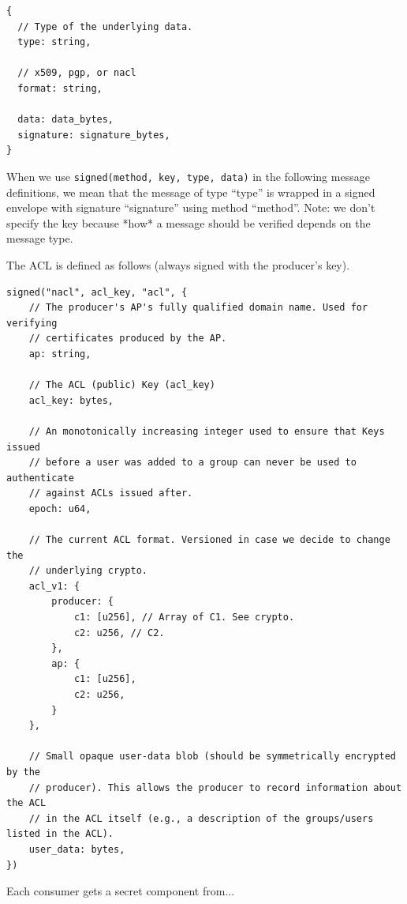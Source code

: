 \documentclass[pdftex,12pt,a4papaer,twoside,notitlepage]{report}
\begin{document}
\begin{lstlisting}[caption={Signed Envelope},float,floatplacement=H]
{
  // Type of the underlying data.
  type: string,

  // x509, pgp, or nacl
  format: string,

  data: data_bytes,
  signature: signature_bytes,
}
\end{lstlisting}

When we use \verb=signed(method, key, type, data)= in the following message
definitions, we mean that the message of type ``type'' is wrapped in a signed
envelope with signature ``signature'' using method ``method''. Note: we don't
specify the key because *how* a message should be verified depends on the
message type.

The ACL is defined as follows (always signed with the producer's key).

\begin{lstlisting}[caption={ACL},float,floatplacement=H]
signed("nacl", acl_key, "acl", {
    // The producer's AP's fully qualified domain name. Used for verifying
    // certificates produced by the AP.
    ap: string,

    // The ACL (public) Key (acl_key)
    acl_key: bytes,

    // An monotonically increasing integer used to ensure that Keys issued
    // before a user was added to a group can never be used to authenticate
    // against ACLs issued after.
    epoch: u64,

    // The current ACL format. Versioned in case we decide to change the
    // underlying crypto.
    acl_v1: {
        producer: {
            c1: [u256], // Array of C1. See crypto.
            c2: u256, // C2.
        },
        ap: {
            c1: [u256],
            c2: u256,
        }
    },

    // Small opaque user-data blob (should be symmetrically encrypted by the
    // producer). This allows the producer to record information about the ACL
    // in the ACL itself (e.g., a description of the groups/users listed in the ACL).
    user_data: bytes,
})
\end{lstlisting}

Each consumer gets a secret component from...
\end{document}
